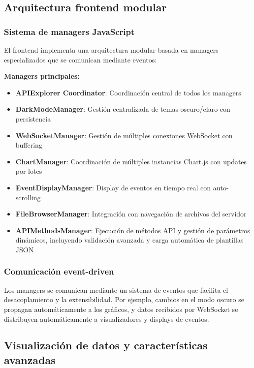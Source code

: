 \subsection{Arquitectura frontend modular}
\label{subsec:arquitectura_frontend_api_explorer}

\subsubsection{Sistema de managers JavaScript}

El frontend implementa una arquitectura modular basada en managers especializados que se comunican mediante eventos:

\textbf{Managers principales:}
\begin{itemize}
    \item \textbf{APIExplorer Coordinator}: Coordinación central de todos los managers
    \item \textbf{DarkModeManager}: Gestión centralizada de temas oscuro/claro con persistencia
    \item \textbf{WebSocketManager}: Gestión de múltiples conexiones WebSocket con buffering
    \item \textbf{ChartManager}: Coordinación de múltiples instancias Chart.js con updates por lotes
    \item \textbf{EventDisplayManager}: Display de eventos en tiempo real con auto-scrolling
    \item \textbf{FileBrowserManager}: Integración con navegación de archivos del servidor
    \item \textbf{APIMethodsManager}: Ejecución de métodos API y gestión de parámetros dinámicos, incluyendo validación avanzada y carga automática de plantillas JSON
\end{itemize}

\subsubsection{Comunicación event-driven}

Los managers se comunican mediante un sistema de eventos que facilita el desacoplamiento y la extensibilidad. Por ejemplo, cambios en el modo oscuro se propagan automáticamente a los gráficos, y datos recibidos por WebSocket se distribuyen automáticamente a visualizadores y displays de eventos.

\subsection{Visualización de datos y características avanzadas}
\label{subsec:visualizacion_api_explorer}

